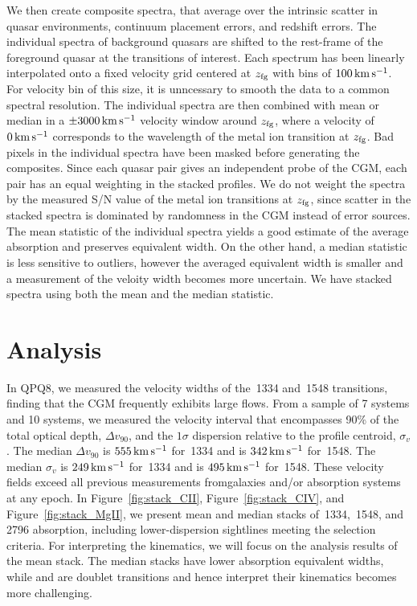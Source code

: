\documentclass[iop]{emulateapj}
\begin{document}
We then create composite spectra, that average over the intrinsic scatter in quasar environments, 
continuum placement errors, and redshift errors. The individual spectra 
of background quasars are shifted to the rest-frame of the foreground quasar at the transitions of 
interest. Each spectrum has been linearly 
interpolated onto a fixed velocity grid centered at $z_{\rm fg}$ with bins of 
$100\,{\rm km\,s^{-1}}$. For velocity bin of this size, it is unncessary to smooth the data to a 
common spectral resolution. The individual spectra are then combined with mean 
or median in a $\pm3000\,{\rm km\,s^{-1}}$ velocity window around $z_{\rm fg}$, where a velocity 
of $0\,{\rm km\,s^{-1}}$ corresponds to the wavelength of the metal ion transition at 
$z_{\rm fg}$. Bad pixels in the individual spectra have been masked before generating the 
composites. Since each quasar pair gives an independent probe of the CGM, each pair has an equal 
weighting in the stacked profiles. We do not weight the spectra by the measured S/N value of the 
metal ion transitions at $z_{\rm fg}$, since scatter in the stacked spectra is dominated by 
randomness in the CGM instead of error sources. The mean statistic of the individual spectra 
yields a good estimate of the average absorption and preserves equivalent width. On the other 
hand, a median statistic is less sensitive to outliers, however the averaged equivalent width is 
smaller and a measurement of the veloity width becomes more uncertain. We have stacked spectra 
using both the mean and the median statistic. 

\section{Analysis}
\label{sec:analysis}

In QPQ8, we measured the velocity widths of the \,1334 and \,1548 transitions, 
finding that the CGM frequently exhibits large flows. From a sample of 7  systems and 10 
 systems, we measured the velocity interval that encompasses 90\% of the total optical 
depth, $\Delta v_90$, and the $1\sigma$ dispersion relative to the profile centroid, $\sigma_v$. 
The median $\Delta v_90$ is $555\,{\rm km\,s^{-1}}$ for \,1334 and is 
$342\,{\rm km\,s^{-1}}$ for \,1548. The median $\sigma_v$ is $249\,{\rm km\,s^{-1}}$ for 
\,1334 and is $495\,{\rm km\,s^{-1}}$ for \,1548. These velocity fields exceed 
all previous measurements fromgalaxies and/or absorption systems at any epoch.  
In Figure~\ref{fig:stack_CII}, Figure~\ref{fig:stack_CIV}, and Figure~\ref{fig:stack_MgII}, we 
present mean and median stacks of \,1334, \,1548, and 2796 
absorption, including lower-dispersion sightlines meeting the selection criteria. For interpreting 
the kinematics, we will focus on the analysis results of the  mean stack. The median 
stacks have lower absorption equivalent widths, while  and  are doublet 
transitions and hence interpret their kinematics becomes more challenging. 
\end{document}
